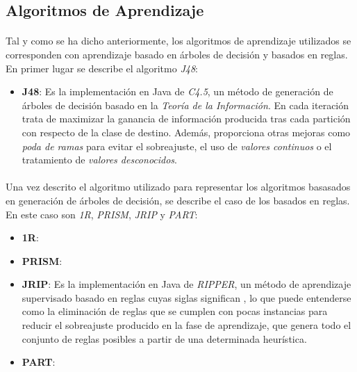 \documentclass{article}
\begin{document}
		\subsection{Algoritmos de Aprendizaje}
		\label{sec:algorithms}

			\paragraph{}
			Tal y como se ha dicho anteriormente, los algoritmos de aprendizaje utilizados se corresponden con aprendizaje basado en árboles de decisión y basados en reglas. En primer lugar se describe el algoritmo \emph{J48}:

			\begin{itemize}
 				\item \textbf{J48}: Es la implementación en Java de \emph{C4.5}, un método de generación de árboles de decisión basado en la \emph{Teoría de la Información}. En cada iteración trata de maximizar la ganancia de información producida tras cada partición con respecto de la clase de destino. Además, proporciona otras mejoras como \emph{poda de ramas} para evitar el sobreajuste, el uso de \emph{valores continuos} o el tratamiento de \emph{valores desconocidos}.
			\end{itemize}

			\paragraph{}
			Una vez descrito el algoritmo utilizado para representar los algoritmos basasados en generación de árboles de decisión, se describe el caso de los basados en reglas. En este caso son \emph{1R}, \emph{PRISM}, \emph{JRIP} y \emph{PART}:

			\begin{itemize}
				\item \textbf{1R}:

				\item \textbf{PRISM}:

				\item \textbf{JRIP}: Es la implementación en Java de \emph{RIPPER}, un método de aprendizaje supervisado basado en reglas cuyas siglas significan , lo que puede entenderse como la eliminación de reglas que se cumplen con pocas instancias para reducir el sobreajuste producido en la fase de aprendizaje, que genera todo el conjunto de reglas posibles a partir de una determinada heurística.

				\item \textbf{PART}:
			\end{itemize}
\end{document}
